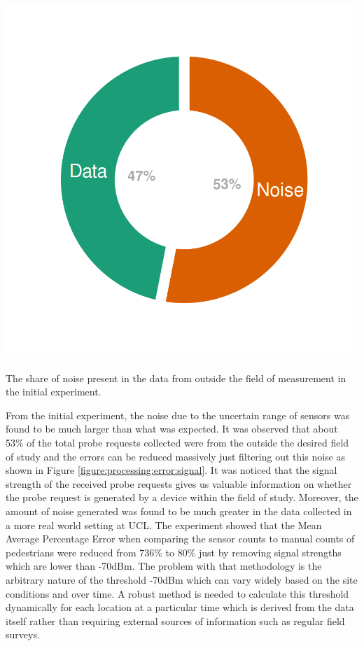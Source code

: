 \begin{marginfigure}
  \includegraphics[trim={10 10 10 10 },clip]{images/processing-error-signal.png}
  \caption{The share of noise present in the data from outside the field of measurement in the initial experiment.}
  \label{figure:processing:error:signal}
\end{marginfigure}

From the initial experiment, the noise due to the uncertain range of sensors was found to be much larger than what was expected.
It was observed that about 53\% of the total probe requests collected were from the outside the desired field of study and the errors can be reduced massively just filtering out this noise as shown in Figure \ref{figure:processing:error:signal}.
It was noticed that the signal strength of the received probe requests gives us valuable information on whether the probe request is generated by a device within the field of study.
Moreover, the amount of noise generated was found to be much greater in the data collected in a more real world setting at UCL.
The experiment showed that the Mean Average Percentage Error when comparing the sensor counts to manual counts of pedestrians were reduced from 736\% to  80\% just by removing signal strengths which are lower than -70dBm.
The problem with that methodology is the arbitrary nature of the threshold -70dBm which can vary widely based on the site conditions and over time.
A robust method is needed to calculate this threshold dynamically for each location at a particular time which is derived from the data itself rather than requiring external sources of information such as regular field surveys.


